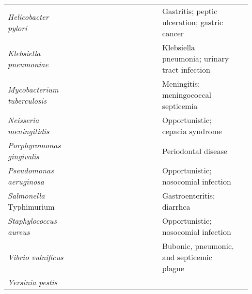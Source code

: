 \begin{sidewaystable*}
\begin{center}
\begin{tabular}{ l  c  c  c  c  c  c  c  c | c  c | c l l }
\textit{Helicobacter pylori} & 
     \cellcolor[gray]{0.8} & \cellcolor[gray]{0.8} & 
     \cellcolor[gray]{0.8} & \cellcolor[gray]{0.8} & 
     & & & & \cellcolor[gray]{0.8} & & 
     & Gastritis; peptic ulceration; gastric cancer & \cite{Thiele:2005el,Schilling:2002ck} \\ \cline{2-12}
\textit{Klebsiella pneumoniae} & 
      & & & & & & & & & \cellcolor[gray]{0.8} 
      & & Klebsiella pneumonia; urinary tract infection & \cite{Liao:2011fp} \\ \cline{2-12}
\textit{Mycobacterium tuberculosis} & 
     \cellcolor[gray]{0.8} & & \cellcolor[gray]{0.8} 
     & \cellcolor[gray]{0.8} & 
     \cellcolor[gray]{0.8} & \cellcolor[gray]{0.8} 
     & & \cellcolor[gray]{0.8} & \cellcolor[gray]{0.8} & \cellcolor[gray]{0.8} 
     & & Meningitis; meningococcal septicemia & \cite{Jamshidi:2007ei,Fang:2010gc,Beste:2007bi} \\ \cline{2-12}
\textit{Neisseria meningitidis} & 
      & \cellcolor[gray]{0.8} & & & & 
      & & & & \cellcolor[gray]{0.8} & 
      & Opportunistic; cepacia syndrome & \cite{Baart:2007cz} \\ \cline{2-12}
\textit{Porphyromonas gingivalis} & 
     \cellcolor[gray]{0.8} & \cellcolor[gray]{0.8} & & & 
     & & & & \cellcolor[gray]{0.8}  & & 
     & Periodontal disease & \cite{Mazumdar:2009gj} \\ \cline{2-12}
\textit{Pseudomonas aeruginosa} &
     \cellcolor[gray]{0.8} & & & & & & &  
     & \cellcolor[gray]{0.8} & & & Opportunistic; nosocomial infection & \cite{Oberhardt:2008fr} \\ \cline{2-12}
\textit{Salmonella} Typhimurium &
     \cellcolor[gray]{0.8} & & & \cellcolor[gray]{0.8} & 
     \cellcolor[gray]{0.8} & & &  
     & \cellcolor[gray]{0.8} & \cellcolor[gray]{0.8} 
     & & Gastroenteritis; diarrhea & \cite{AbuOun:2009co,Thiele:2011fy,Raghunathan:2009kf} \\ \cline{2-12}
\textit{Staphylococcus aureus} & 
     \cellcolor[gray]{0.8} & \cellcolor[gray]{0.8} & & \cellcolor[gray]{0.8} & 
     & & & & \cellcolor[gray]{0.8} & \cellcolor[gray]{0.8} & 
     & Opportunistic; nosocomial infection & \cite{Lee:2009fc,Heinemann:2005fc,Becker:2005hf} \\ \cline{2-12}
\textit{Vibrio vulnificus} & 
      & & & & & & \cellcolor[gray]{0.8} & & \cellcolor[gray]{0.8} & \cellcolor[gray]{0.8} 
      & \cellcolor[gray]{0.8} & Bubonic, pneumonic, and septicemic plague & \cite{Kim:2011jm} \\ \cline{2-12}
\textit{Yersinia pestis} & 

\end{tabular}
\end{center}
\end{sidewaystable*}
